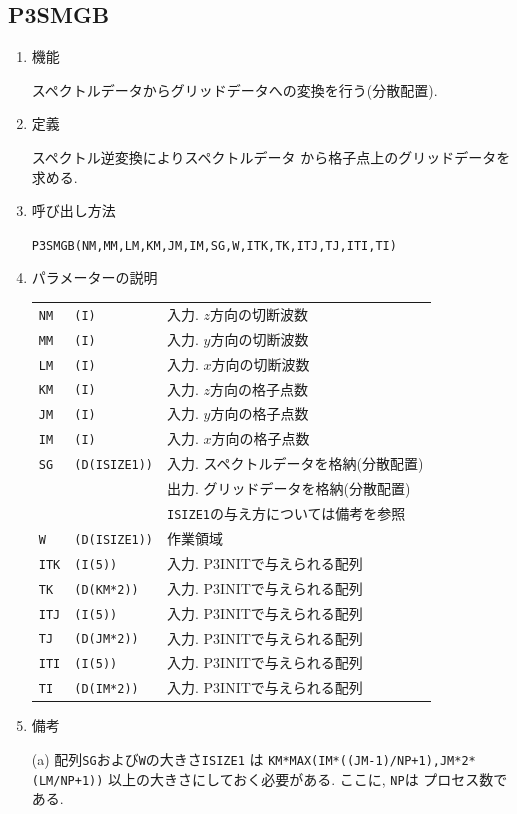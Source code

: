 \documentclass[a4j,fleqn]{jarticle}
\begin{document}

\subsection{P3SMGB}

\begin{enumerate}

\item 機能 

スペクトルデータからグリッドデータへの変換を行う(分散配置).

\item 定義

スペクトル逆変換によりスペクトルデータ
から格子点上のグリッドデータを求める.

\item 呼び出し方法 

{\tt P3SMGB(NM,MM,LM,KM,JM,IM,SG,W,ITK,TK,ITJ,TJ,ITI,TI)}
  
\item パラメーターの説明

\begin{tabular}{lll}
{\tt NM} & {\tt (I)} & 入力. $z$方向の切断波数\\
{\tt MM} & {\tt (I)} & 入力. $y$方向の切断波数\\
{\tt LM} & {\tt (I)} & 入力. $x$方向の切断波数\\
{\tt KM} & {\tt (I)} & 入力. $z$方向の格子点数\\
{\tt JM} & {\tt (I)} & 入力. $y$方向の格子点数\\
{\tt IM} & {\tt (I)} & 入力. $x$方向の格子点数\\
{\tt SG} & {\tt (D(ISIZE1))} &
                 入力. スペクトルデータを格納(分散配置)\\
        &                 &
	         出力. グリッドデータを格納(分散配置)\\
        &                 &
	         {\tt ISIZE1}の与え方については備考を参照\\
{\tt W} & {\tt (D(ISIZE1))} & 作業領域\\
{\tt ITK} & {\tt (I(5))} & 入力. P3INITで与えられる配列\\
{\tt TK} & {\tt (D(KM*2))} & 入力. P3INITで与えられる配列\\
{\tt ITJ} & {\tt (I(5))} & 入力. P3INITで与えられる配列\\
{\tt TJ} & {\tt (D(JM*2))} & 入力. P3INITで与えられる配列\\
{\tt ITI} & {\tt (I(5))} & 入力. P3INITで与えられる配列\\
{\tt TI} & {\tt (D(IM*2))} & 入力. P3INITで与えられる配列
\end{tabular}

\item 備考

(a) 配列{\tt SG}および{\tt W}の大きさ{\tt ISIZE1}
     は {\tt KM*MAX(IM*((JM-1)/NP+1),JM*2*(LM/NP+1))}
     以上の大きさにしておく必要がある. ここに, {\tt NP}は
     プロセス数である.

\end{enumerate}
\end{document}
